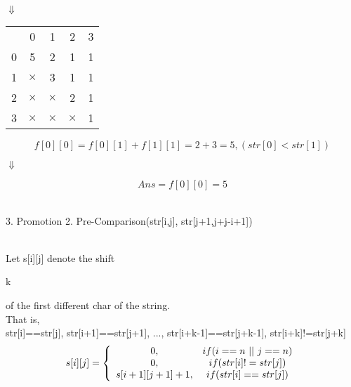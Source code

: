 \documentclass[a4paper,12pt]{article}
\begin{document}
\begin{center}
$\Downarrow$
\end{center}

\begin{center}
    \begin{tabular}{ r|c|c|c|c| }
        \multicolumn{1}{r}{} & \multicolumn{1}{c}{0} & \multicolumn{1}{c}{1} & \multicolumn{1}{c}{2} & \multicolumn{1}{c}{3}\\
        \cline{2-5}
        0 & 5 & 2 & 1 & 1 \\
        \cline{2-5}
        1 & $\times$ & 3 & 1 & 1 \\
        \cline{2-5}
        2 & $\times$ & $\times$ & 2 & 1 \\
        \cline{2-5}
        3 & $\times$ & $\times$ & $\times$ & 1 \\
        \cline{2-5}
    \end{tabular}
\end{center}

\[
f[0][0] = f[0][1] + f[1][1] = 2 + 3 = 5, (str[0] < str[1])
\]

\begin{center}
$\Downarrow$
\end{center}

\[
Ans = f[0][0] = 5
\]
\\
\begin{bfseries}
3. Promotion 2. Pre-Comparison(str[i,j], str[j+1,j+j-i+1]) \\
\end{bfseries}
\\
Let s[i][j] denote the shift \begin{itshape}k\end{itshape} of the first different char of the string. \\
That is,\\
str[i]==str[j], str[i+1]==str[j+1], ..., str[i+k-1]==str[j+k-1], str[i+k]!=str[j+k] \\
\[
s[i][j] =
\left\{
    \begin{array}{c c}
        0, & if (i==n \ || \ j==n) \\
        0, & if (str[i]!=str[j]) \\
        s[i+1][j+1]+1, & if (str[i]==str[j]) \\
    \end{array}
\right.
\]
\end{document}
